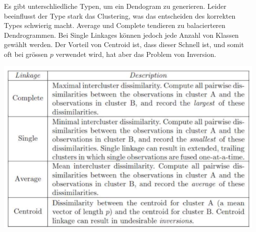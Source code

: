 Es gibt unterschliedliche Typen, um ein Dendogram zu generieren. Leider beeinflusst der Type stark das Clustering, was das entscheiden des korrekten Types schwierig macht. Average und Complete tendieren zu balacierteren Dendrogrammen. Bei Single Linkages können jedoch jede Anzahl von Klassen gewählt werden. Der Vorteil von Centroid ist, dass dieser Schnell ist, und somit oft bei grössen $p$ verwendet wird, hat aber das Problem von Inversion.
\begin{center}
	\includegraphics[width=\columnwidth]{Images/dendogram1}
\end{center}
